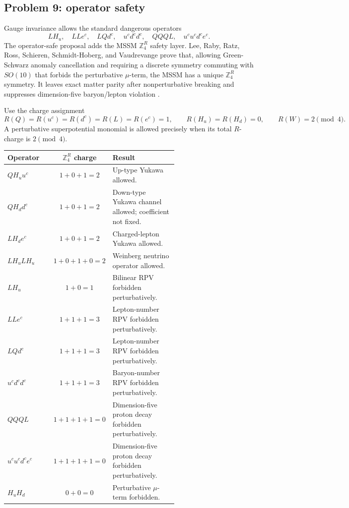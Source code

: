 \documentclass[11pt]{article}
\theoremstyle{remark}
\theoremstyle{plain}
\newcommand{\ZfourR}{\mathbb Z_4^R}
\begin{document}
\subsection{Problem 9: operator safety}

Gauge invariance allows the standard dangerous operators
\[
LH_u,\quad LLe^c,\quad LQd^c,\quad u^cd^cd^c,\quad QQQL,\quad u^cu^cd^ce^c.
\]
The operator-safe proposal adds the MSSM \(\ZfourR\) safety layer. Lee, Raby, Ratz, Ross,
Schieren, Schmidt-Hoberg, and Vaudrevange prove that, allowing Green-Schwarz anomaly
cancellation and requiring a discrete symmetry commuting with \(SO(10)\) that forbids the
perturbative \(\mu\)-term, the MSSM has a unique \(\ZfourR\) symmetry. It leaves exact matter
parity after nonperturbative breaking and suppresses dimension-five baryon/lepton violation
\cite{LeeRabyRatzRossSchierenSchmidtHobergVaudrevange2010}.

Use the charge assignment
\[
R(Q)=R(u^c)=R(d^c)=R(L)=R(e^c)=1,
\qquad
R(H_u)=R(H_d)=0,
\qquad
R(W)=2\pmod4.
\]
A perturbative superpotential monomial is allowed precisely when its total \(R\)-charge is
\(2\pmod4\).

\begin{longtable}{L{0.28\linewidth}c L{0.40\linewidth}}
\toprule
\textbf{Operator} & \textbf{\(\ZfourR\) charge} & \textbf{Result} \\
\midrule
\(QH_uu^c\) & \(1+0+1=2\) & Up-type Yukawa allowed. \\
\(QH_dd^c\) & \(1+0+1=2\) & Down-type Yukawa channel allowed; coefficient not fixed. \\
\(LH_de^c\) & \(1+0+1=2\) & Charged-lepton Yukawa allowed. \\
\(LH_uLH_u\) & \(1+0+1+0=2\) & Weinberg neutrino operator allowed. \\
\(LH_u\) & \(1+0=1\) & Bilinear RPV forbidden perturbatively. \\
\(LLe^c\) & \(1+1+1=3\) & Lepton-number RPV forbidden perturbatively. \\
\(LQd^c\) & \(1+1+1=3\) & Lepton-number RPV forbidden perturbatively. \\
\(u^cd^cd^c\) & \(1+1+1=3\) & Baryon-number RPV forbidden perturbatively. \\
\(QQQL\) & \(1+1+1+1=0\) & Dimension-five proton decay forbidden perturbatively. \\
\(u^cu^cd^ce^c\) & \(1+1+1+1=0\) & Dimension-five proton decay forbidden perturbatively. \\
\(H_uH_d\) & \(0+0=0\) & Perturbative \(\mu\)-term forbidden. \\
\bottomrule
\end{longtable}
\end{document}
